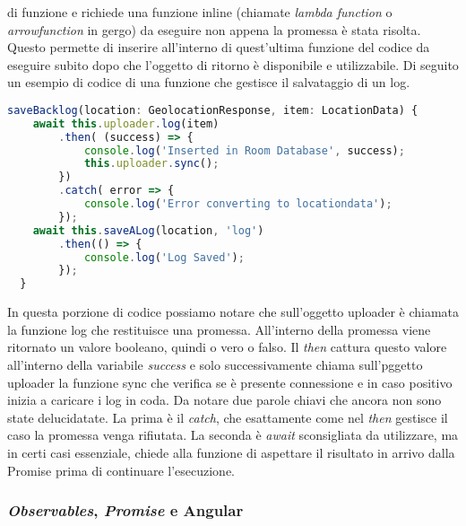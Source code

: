 di funzione e richiede una funzione inline (chiamate \textit{lambda function} o \textit{arrowfunction} in gergo) da
eseguire non appena la promessa è stata risolta. Questo permette di inserire all'interno di quest'ultima funzione del
codice da eseguire subito dopo che l'oggetto di ritorno è disponibile e utilizzabile. Di seguito un esempio di codice
di una funzione che gestisce il salvataggio di un log.
\begin{lstlisting}[language=Javascript]
  saveBacklog(location: GeolocationResponse, item: LocationData) {
    await this.uploader.log(item)
        .then( (success) => {
            console.log('Inserted in Room Database', success);
            this.uploader.sync();
        })
        .catch( error => {
            console.log('Error converting to locationdata');
        });
    await this.saveALog(location, 'log')
        .then(() => {
            console.log('Log Saved');
        });
  }
\end{lstlisting}
In questa porzione di codice possiamo notare che sull'oggetto uploader è chiamata la funzione log che restituisce una
promessa. All'interno della promessa viene ritornato un valore booleano, quindi o vero o falso. Il \textit{then} cattura
questo valore all'interno della variabile \textit{success} e solo successivamente chiama sull'pggetto uploader la
funzione sync che verifica se è presente connessione e in caso positivo inizia a caricare i log in coda. Da notare due
parole chiavi che ancora non sono state delucidatate. La prima è il \textit{catch}, che esattamente come nel \textit{then} gestisce il
caso la promessa venga rifiutata. La seconda è \textit{await} sconsigliata da utilizzare, ma in certi casi essenziale,
chiede alla funzione di aspettare il risultato in arrivo dalla Promise prima di continuare l'esecuzione.

\subsubsection{\textit{Observables}, \textit{Promise} e Angular} 

